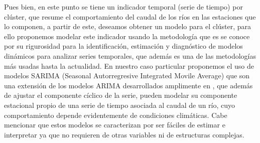 \documentclass[12pt,oneside]{book}\usepackage[]{graphicx}\usepackage[]{color}
\theoremstyle{definition} %
\begin{document}
Pues bien, en este punto se tiene un indicador temporal (serie de tiempo) por clúster, que resume el comportamiento del caudal de los ríos en las estaciones que lo componen, a partir de este, deseamos obtener un modelo para el clúster, para ello proponemos modelar este indicador usando la metodología \citeauthor{box1970time} \citeyear{box1970time} que es se conoce por su rigurosidad para la identificación, estimación y diagnóstico de modelos dinámicos para analizar series temporales, que además es una de las metodologías más usadas hasta la actualidad.
En nuestro caso particular proponemos el uso de modelos SARIMA (Seasonal Autorregresive Integrated Movile Average) que son una extensión de los modelos ARIMA desarrollados amplimente en \citeauthor{box2015time} \citeyear{box2015time}, que además de ajustar el componente cíclico de la serie, pueden modelar su componente estacional propio de una serie de tiempo asociada al caudal de un río, cuyo comportamiento depende evidentemente de condiciones climáticas. Cabe mencionar que estos modelos se caracterizan por ser fáciles de estimar e interpretar ya que no requieren de otras variables ni de estructuras complejas.
%


\end{document}

